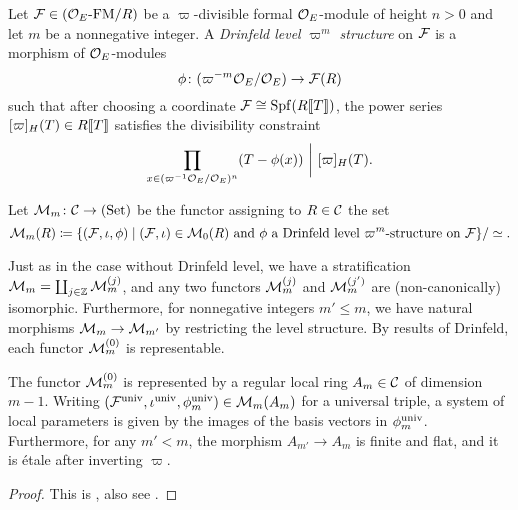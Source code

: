 \documentclass[../main.tex]{subfiles}
\begin{document}
\begin{defi}
  Let $\mathcal{F} \in {({\mathcal{O}_E}\textnormal-\allowbreak\mathrm{FM}/{R})}$ be a $\varpi$-divisible formal $\mathcal{O}_E$-module
  of height $n>0$ and let $m$ be a nonnegative integer. A \emph{Drinfeld level  $\varpi^m$ structure} on $\mathcal{F}$ is a morphism of
  $\mathcal{O}_E$-modules 
  \begin{equation*}
    \phi\colon {(\varpi^{-m}\mathcal{O}_E/\mathcal{O}_E)} \to \mathcal{F}(R)
  \end{equation*}
  such that after choosing a coordinate $\mathcal{F} \cong \operatorname{Spf}(R\llbracket T \rrbracket)$, the 
  power series $[\varpi]_H(T) \in R\llbracket T \rrbracket$ satisfies the divisibility
  constraint
  \begin{equation*}
    \prod_{x \in (\varpi^{-1}\mathcal{O}_E/\mathcal{O}_E)^n}(T - \phi(x)) \ \bigg\vert \ [\varpi]_H(T).
  \end{equation*}
\end{defi}

\begin{defi}\label{def:LTDefSpaceWithLevel}
  Let $\mathcal{M}_m\colon \mathcal{C} \to {(\mathrm{Set})}$ be the functor assigning to $R \in \mathcal{C}$ the set 
  \begin{equation*}
    \mathcal{M}_m(R) \coloneqq \{(\mathcal{F}, \iota, \phi) \mid (\mathcal{F}, \iota) \in \mathcal{M}_0(R) \text{ and }\phi
    \text{ a Drinfeld level $\varpi^m$-structure on $\mathcal{F}$}\}/\simeq.
  \end{equation*}
\end{defi}

Just as in the case without Drinfeld level, we have a stratification $\mathcal{M}_m =
\coprod_{j \in \mathbb{Z}} \mathcal{M}_m^{(j)}$, and any two functors $\mathcal{M}_m^{(j)}$ and
$\mathcal{M}_m^{(j')}$ are (non-canonically)  isomorphic.
Furthermore, for nonnegative integers $m' \leq m$, we have natural morphisms
$\mathcal{M}_m \to \mathcal{M}_{m'}$ by restricting the level structure. 
By results of Drinfeld, each functor $\mathcal{M}_m^{(0)}$ is representable.

\begin{thm}\label{thm:RepresentabilityOfDefSpaceWithLevel}
  The functor $\mathcal{M}_m^{(0)}$ is represented by a regular local ring $A_m \in \mathcal{C}$ of 
  dimension $m-1$. Writing $(\mathcal{F}^{\mathrm{univ}}, \iota^{\mathrm{univ}}, \phi_m^{\mathrm{univ}}) \in \mathcal{M}_m(A_m)$ for
  a universal triple, a system of local parameters is given by the images of the basis vectors in $\phi_m^{\mathrm{univ}}$. Furthermore, for any $m' < m$, the morphism 
  $A_{m'} \to A_m$ is finite and flat, and it is \'etale after inverting $\varpi$. 
\begin{proof}
  This is \cite[Proposition 4.3]{drinfel1974elliptic}, also see \cite[Proposition 2.2.5]{Strauch2008DefSp}.
\end{proof}
\end{thm}
\end{document}
